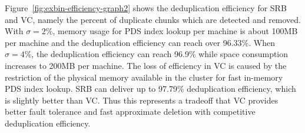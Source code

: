 Figure~\ref{fig:exbin-efficiency-graph2} shows the deduplication efficiency for SRB and VC,
namely the percent of duplicate chunks
which are detected and removed.
With $\sigma=2\%$, memory usage for PDS index lookup per machine is about 100MB per machine
and  the deduplication efficiency can reach over 96.33\%.
When $\sigma=4\%$, the deduplication efficiency can reach 96.9\% while space consumption increases to 200MB per machine. 
The loss of efficiency in VC is caused by the restriction of the physical memory available
in the cluster for fast in-memory PDS index lookup. 
SRB can deliver up to 97.79\% deduplication efficiency, which is slightly better than VC.
Thus this represents a tradeoff that VC provides better fault tolerance and fast approximate deletion
with competitive deduplication efficiency.


